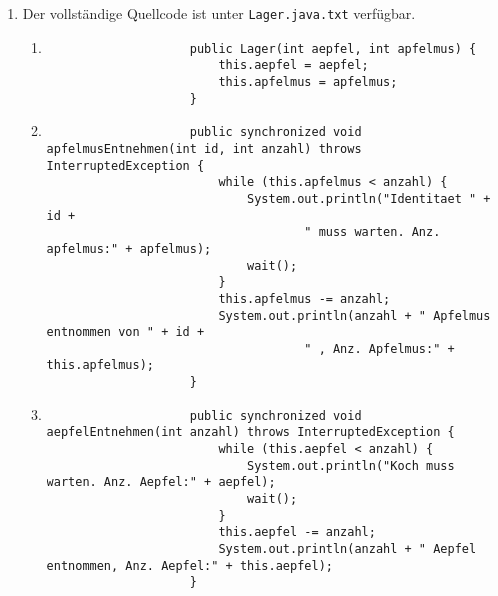 \begin{enumerate}[label={Aufgabe H\arabic*},start=50]
    \item Der vollständige Quellcode ist unter \texttt{Lager.java.txt} verfügbar.
        \begin{enumerate}
            \makeatletter
                \setlength{\leftmargins}{\@totalleftmargin}
            \makeatother

            \item \blanko
                \begin{verbatim}
                    public Lager(int aepfel, int apfelmus) {
                        this.aepfel = aepfel;
                        this.apfelmus = apfelmus;
                    }
                \end{verbatim}
            \item \blanko
                \begin{verbatim}
                    public synchronized void apfelmusEntnehmen(int id, int anzahl) throws InterruptedException {
                        while (this.apfelmus < anzahl) {
                            System.out.println("Identitaet " + id + 
                                    " muss warten. Anz. apfelmus:" + apfelmus);
                            wait();
                        }
                        this.apfelmus -= anzahl;
                        System.out.println(anzahl + " Apfelmus entnommen von " + id + 
                                    " , Anz. Apfelmus:" + this.apfelmus);
                    }
                \end{verbatim}
            \item \blanko
                \begin{verbatim}
                    public synchronized void aepfelEntnehmen(int anzahl) throws InterruptedException {
                        while (this.aepfel < anzahl) {
                            System.out.println("Koch muss warten. Anz. Aepfel:" + aepfel);
                            wait();
                        }
                        this.aepfel -= anzahl;
                        System.out.println(anzahl + " Aepfel entnommen, Anz. Aepfel:" + this.aepfel);
                    }
                \end{verbatim}

\end{enumerate}
\end{enumerate}
